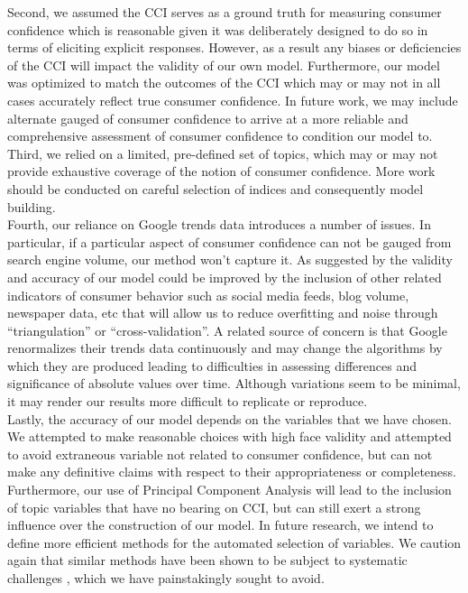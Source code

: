 \documentclass[10pt]{article}
\begin{document}
Second, we assumed the CCI serves as a ground truth for measuring consumer confidence which is reasonable given it was deliberately designed to do so in terms of eliciting explicit responses. However, as a result any biases or deficiencies of the CCI will impact the validity of our own model. Furthermore, our model was optimized to match the outcomes of the CCI which may or may not in all cases accurately reflect true consumer confidence. In future work, we may include alternate gauged of consumer confidence to arrive at a more reliable and comprehensive assessment of consumer confidence to condition our model to.\\

Third, we relied on a limited, pre-defined set of topics, which may or may not provide exhaustive coverage of the notion of consumer confidence. More work should be conducted on careful selection of indices and consequently model building.\\

Fourth, our reliance on Google trends data introduces a number of issues. In particular, if a particular aspect of consumer confidence can not be gauged from search engine volume, our method won't capture it. As suggested by \cite{Lazer14032014} the validity and accuracy of our model could be improved by the inclusion of other related indicators of consumer behavior such as social media feeds, blog volume, newspaper data, etc that will allow us to reduce overfitting and noise through ``triangulation'' or ``cross-validation''. A related source of concern is that Google renormalizes their trends data continuously and may change the algorithms by which they are produced  leading to difficulties in assessing differences and significance of absolute values over time. Although variations seem to be minimal, it may render our results more difficult to replicate or reproduce. \\

Lastly, the accuracy of our model depends on the variables that we have chosen. We attempted to make reasonable choices with high face validity and attempted to avoid extraneous variable not related to consumer confidence, but can not make any definitive claims with respect to their appropriateness or completeness. Furthermore, our use of Principal Component Analysis will lead to the inclusion of topic variables that have no bearing on CCI, but can still exert a strong influence over the construction of our model. In future research, we intend to define more efficient methods for the automated selection of variables.  We caution again that similar methods have been shown to be subject to systematic challenges \cite{Lazer14032014}, which we have painstakingly sought to avoid.\\
\end{document}
